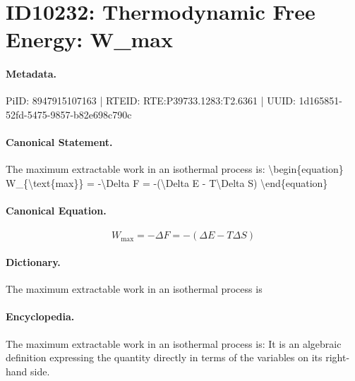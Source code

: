 \section*{ID10232: Thermodynamic Free Energy: W\_max}
\paragraph{Metadata.}
PiID: 8947915107163 | RTEID: RTE:P39733.1283:T2.6361 | UUID: 1d165851-52fd-5475-9857-b82e698c790c

\paragraph{Canonical Statement.}
The maximum extractable work in an isothermal process is: \textbackslash{}begin\{equation\} W\_\{\textbackslash{}text\{max\}\} = -\textbackslash{}Delta F = -(\textbackslash{}Delta E - T\textbackslash{}Delta S) \textbackslash{}end\{equation\}

\paragraph{Canonical Equation.}
\[
W_{\text{max}} = -\Delta F = -(\Delta E - T\Delta S)
\]

\paragraph{Dictionary.}
The maximum extractable work in an isothermal process is

\paragraph{Encyclopedia.}
The maximum extractable work in an isothermal process is: It is an algebraic definition expressing the quantity directly in terms of the variables on its right-hand side.
